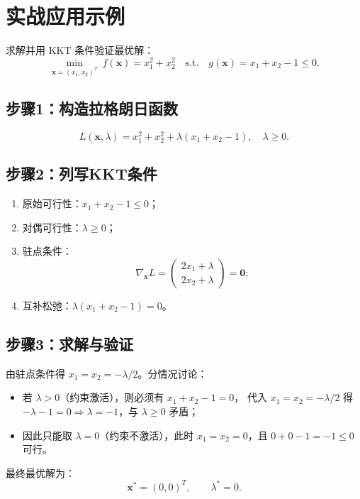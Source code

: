 \documentclass[12pt,a4paper]{ctexart}
\renewcommand{\vec}[1]{\boldsymbol{#1}} %
\theoremstyle{definition}
\theoremstyle{plain}
\begin{document}
	\section{实战应用示例}
	\begin{tcolorbox}[title={示例：带不等式约束的二次优化（KKT快速检验）}]
		求解并用 KKT 条件验证最优解：
		\[
		\min_{\vec{x}=(x_1,x_2)^T}\ f(\vec{x}) = x_1^2 + x_2^2
		\quad \text{s.t.}\quad
		g(\vec{x}) = x_1 + x_2 - 1 \le 0.
		\]
	\end{tcolorbox}
	
	\subsection{步骤1：构造拉格朗日函数}
	\[
	L(\vec{x},\lambda)=x_1^2+x_2^2+\lambda(x_1+x_2-1),\quad \lambda\ge 0.
	\]
	
	\subsection{步骤2：列写KKT条件}
	\begin{enumerate}
		\item 原始可行性：$x_1+x_2-1\le 0$；
		\item 对偶可行性：$\lambda\ge 0$；
		\item 驻点条件：
		\[
		\nabla_{\vec{x}}L=
		\begin{pmatrix}
			2x_1+\lambda\\
			2x_2+\lambda
		\end{pmatrix}
		=\vec{0};
		\]
		\item 互补松弛：$\lambda(x_1+x_2-1)=0$。
	\end{enumerate}
	
	\subsection{步骤3：求解与验证}
	由驻点条件得 $x_1=x_2=-\lambda/2$。分情况讨论：
	\begin{itemize}
		\item 若 $\lambda>0$（约束激活），则必须有 $x_1+x_2-1=0$，
		代入 $x_1=x_2=-\lambda/2$ 得 $-\lambda-1=0\Rightarrow \lambda=-1$，与 $\lambda\ge 0$ 矛盾；
		\item 因此只能取 $\lambda=0$（约束不激活），此时 $x_1=x_2=0$，且 $0+0-1=-1\le 0$ 可行。
	\end{itemize}
	最终最优解为：
	\[
	\vec{x}^*=(0,0)^T,\qquad \lambda^*=0.
	\]
	
\end{document}
